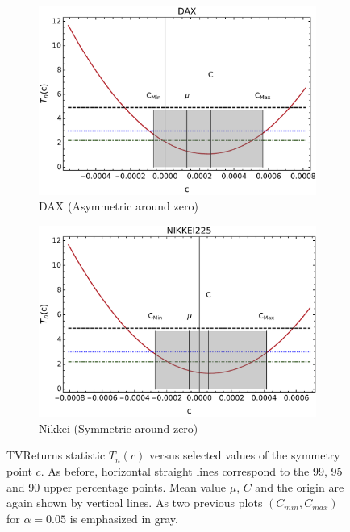 \documentclass{elsarticle}
\begin{document}
\begin{figure}[h!tb]
\begin{subfigure}[b]{0.45\textwidth}
            \centering 
            \includegraphics[width=\textwidth]{figures/SymmetryPlots/simetria_TVReturns_DAX.pdf}
            \caption[]%
            {{\small DAX (Asymmetric around zero)}}
            \label{fig:TVRetsFigsDAX}
        \end{subfigure}
        \quad
        \begin{subfigure}[b]{0.45\textwidth}
            \centering 
            \includegraphics[width=\textwidth]{figures/SymmetryPlots/simetria_TVReturns_NIKKEI.pdf}
            \caption[]%
            {{\small Nikkei (Symmetric around zero)}}
            \label{fig:TVRetsFigsNikkei}
        \end{subfigure}
        \caption[TVReturns statistic $T_{n}(c)$ versus selected values of the symmetry point $c$ ]
        {\small TVReturns statistic $T_{n}(c)$ versus selected values of the symmetry point $c$. As before, horizontal straight lines correspond to the 99, 95 and 90 upper percentage points. Mean value $\mu$, $C$ and the origin are again shown by vertical lines. As two previous plots $(C_{min},C_{max})$ for $\alpha=0.05$ is emphasized in gray. } 
        \label{fig:TVRetsFigs}
\end{figure}
\end{document}

